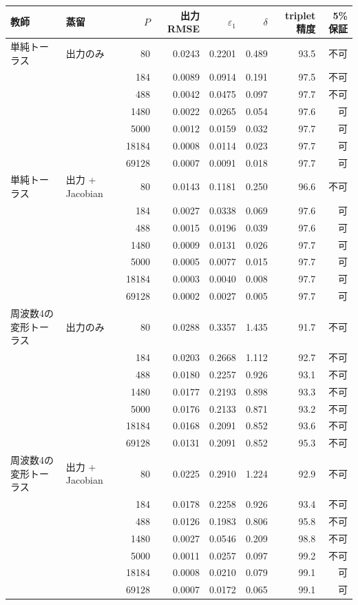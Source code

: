\begin{tabular}{llrrrrrr}
\toprule
教師 & 蒸留 & $P$ & 出力RMSE & $\varepsilon_1$ & $\delta$ & triplet精度 & 5\%保証 \\
\midrule
単純トーラス & 出力のみ & 80 & 0.0243 & 0.2201 & 0.489 & 93.5 & 不可 \\
 &  & 184 & 0.0089 & 0.0914 & 0.191 & 97.5 & 不可 \\
 &  & 488 & 0.0042 & 0.0475 & 0.097 & 97.7 & 不可 \\
 &  & 1480 & 0.0022 & 0.0265 & 0.054 & 97.6 & 可 \\
 &  & 5000 & 0.0012 & 0.0159 & 0.032 & 97.7 & 可 \\
 &  & 18184 & 0.0008 & 0.0114 & 0.023 & 97.7 & 可 \\
 &  & 69128 & 0.0007 & 0.0091 & 0.018 & 97.7 & 可 \\
単純トーラス & 出力 + Jacobian & 80 & 0.0143 & 0.1181 & 0.250 & 96.6 & 不可 \\
 &  & 184 & 0.0027 & 0.0338 & 0.069 & 97.6 & 可 \\
 &  & 488 & 0.0015 & 0.0196 & 0.039 & 97.6 & 可 \\
 &  & 1480 & 0.0009 & 0.0131 & 0.026 & 97.7 & 可 \\
 &  & 5000 & 0.0005 & 0.0077 & 0.015 & 97.7 & 可 \\
 &  & 18184 & 0.0003 & 0.0040 & 0.008 & 97.7 & 可 \\
 &  & 69128 & 0.0002 & 0.0027 & 0.005 & 97.7 & 可 \\
\midrule
周波数4の変形トーラス & 出力のみ & 80 & 0.0288 & 0.3357 & 1.435 & 91.7 & 不可 \\
 &  & 184 & 0.0203 & 0.2668 & 1.112 & 92.7 & 不可 \\
 &  & 488 & 0.0180 & 0.2257 & 0.926 & 93.1 & 不可 \\
 &  & 1480 & 0.0177 & 0.2193 & 0.898 & 93.3 & 不可 \\
 &  & 5000 & 0.0176 & 0.2133 & 0.871 & 93.2 & 不可 \\
 &  & 18184 & 0.0168 & 0.2091 & 0.852 & 93.6 & 不可 \\
 &  & 69128 & 0.0131 & 0.2091 & 0.852 & 95.3 & 不可 \\
周波数4の変形トーラス & 出力 + Jacobian & 80 & 0.0225 & 0.2910 & 1.224 & 92.9 & 不可 \\
 &  & 184 & 0.0178 & 0.2258 & 0.926 & 93.4 & 不可 \\
 &  & 488 & 0.0126 & 0.1983 & 0.806 & 95.8 & 不可 \\
 &  & 1480 & 0.0027 & 0.0546 & 0.209 & 98.8 & 不可 \\
 &  & 5000 & 0.0011 & 0.0257 & 0.097 & 99.2 & 不可 \\
 &  & 18184 & 0.0008 & 0.0210 & 0.079 & 99.1 & 可 \\
 &  & 69128 & 0.0007 & 0.0172 & 0.065 & 99.1 & 可 \\
\bottomrule
\end{tabular}

